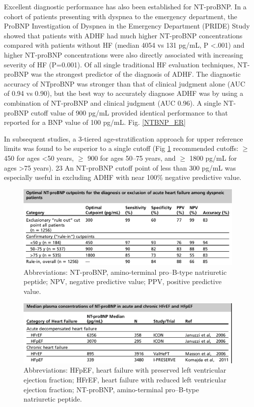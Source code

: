 \documentclass[14pt,a4paper,onecolumn]{extarticle}
\begin{document}
Excellent diagnostic performance has also been established for NT-proBNP. In a cohort of patients presenting with dyspnea to the emergency department, the ProBNP Investigation of Dyspnea in the Emergency Department (PRIDE) Study showed that patients with ADHF had much higher NT-proBNP concentrations compared with patients without HF (median 4054 vs 131 pg/mL, P <.001) and higher NT-proBNP concentrations were also directly associated with increasing severity of HF (P=0.001). Of all single traditional HF evaluation techniques, NT-proBNP was the strongest predictor of the diagnosis of ADHF. The diagnostic accuracy of NTproBNP was stronger than that of clinical judgment alone (AUC of 0.94 vs 0.90), but the best way to accurately diagnose ADHF was by using a combination of NT-proBNP and clinical judgment (AUC 0.96). A single NT-proBNP cutoff value of 900 pg/mL provided identical performance to that reported for a BNP value of 100 pg/mL. Fig. \ref{NTBNP_ER} \citep{Januzzi2005}

In subsequent studies, a 3-tiered age-stratification approach for upper reference limits was found to be superior to a single cutoff (Fig \ref{NTBNP_cutpoints} recommended cutoffs: $\geq$ 450 for ages <50 years, $\geq$ 900 for ages 50–75 years, and $\geq$ 1800 pg/mL for ages >75 years). 23 An NT-proBNP cutoff point of less than 300 pg/mL was especially useful in excluding ADHF with near 100\% negative predictive value. \citep{Januzzi2006a}

\begin{figure}   \includegraphics{../../images/NTBNP_cutpoints.png}   \caption{Abbreviations: NT-proBNP, amino-terminal pro–B-type natriuretic peptide; NPV, negative predictive value; PPV, positive predictive value.\citep{Januzzi2006a}}   \label{NTBNP_cutpoints} \end{figure}

\begin{figure}   \includegraphics{../../images/NTBNP_HF.png}   \caption{Abbreviations: HFpEF, heart failure with preserved left ventricular ejection fraction; HFrEF, heart failure with reduced left ventricular ejection fraction; NT-proBNP, amino-terminal pro–B-type natriuretic peptide. \citep{Richards2018}}   \label{NTBNP_HF} \end{figure}
\end{document}
